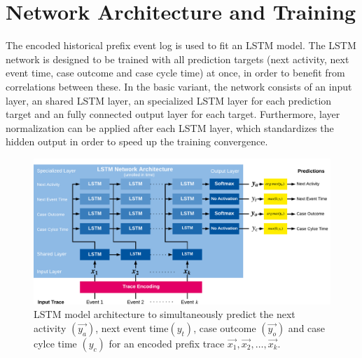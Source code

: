 \section{Network Architecture and Training}

The encoded historical prefix event log is used to fit an LSTM model.
The LSTM network is designed to be trained with all prediction targets (next activity, next event time, case outcome and case cycle time) at once, in order to benefit from correlations between these.
In the basic variant, the network consists of an input layer, an shared LSTM layer, an specialized LSTM layer for each prediction target and an fully connected output layer for each target.
Furthermore, layer normalization \cite{DBLP:journals/corr/BaKH16} can be applied after each LSTM layer, which standardizes the hidden output in order to speed up the training convergence.

\begin{figure}[!htbp]
	\centering
	\includegraphics[width=\textwidth]{figures/network}
	\caption[LSTM model architecture for text-aware process prediction]{LSTM model architecture to simultaneously predict the next activity $(\vec{y_a})$, next event time$(y_t)$, case outcome $(\vec{y_o})$ and case cylce time $(y_c)$ for an encoded prefix trace $\vec{x_1}, \vec{x_2}, \dots, \vec{x_k}$.}
	\label{fig:network}
\end{figure}


